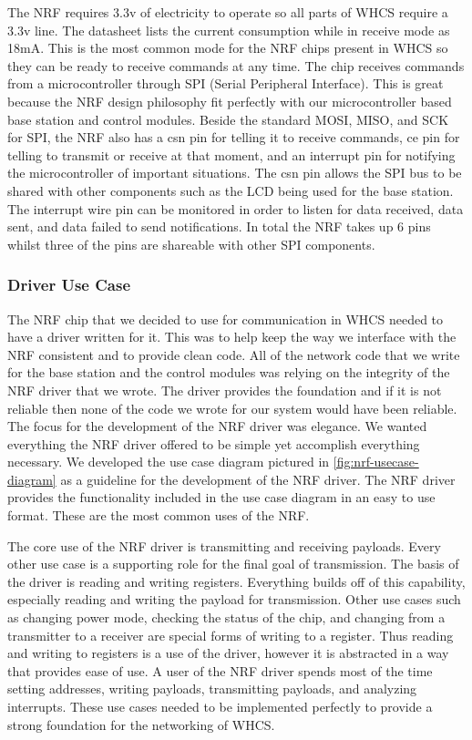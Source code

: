 The NRF requires 3.3v of electricity to operate so all parts of WHCS 
require a 3.3v line. The datasheet lists the current consumption while in
receive mode as 18mA. This is the most common mode for the NRF chips
present in WHCS so they can be ready to receive commands at any time. The chip
receives commands from a microcontroller through SPI (Serial Peripheral
Interface). This is great because the NRF design philosophy fit perfectly with
our microcontroller based base station and control modules. Beside the standard
MOSI, MISO, and SCK for SPI, the NRF also has a csn pin for telling it to
receive commands, ce pin for telling to transmit or receive at that moment,
and an interrupt pin for notifying the microcontroller of important situations.
The csn pin allows the SPI bus to be shared with other components such as
the LCD being used for the base station. The interrupt wire pin can be
monitored in order to listen for data received, data sent, and data failed to
send notifications. In total the NRF takes up 6 pins whilst three of the
pins are shareable with other SPI components.

\subsubsection{Driver Use Case}
The NRF chip that we decided to use for communication in WHCS needed to
have a driver written for it. This was to help keep the way we interface with the
NRF consistent and to provide clean code. All of the network code that we
write for the base station and the control modules was relying on the
integrity of the NRF driver that we wrote.  The driver provides the foundation
and if it is not reliable then none of the code we wrote for our system would have been
reliable. The focus for the development of the NRF driver was elegance. We wanted 
everything the NRF driver offered to be simple yet accomplish everything
necessary. We developed the use case diagram pictured in
\autoref{fig:nrf-usecase-diagram} as a guideline for the development of the NRF
driver. The NRF driver provides the functionality included in the use
case diagram in an easy to use format.  These are the most common uses of
the NRF.


The core use of the NRF driver is transmitting and receiving payloads. Every
other use case is a supporting role for the final goal of transmission. The
basis of the driver is reading and writing registers. Everything builds off of this capability, especially reading and writing the payload for
transmission. Other use cases such as changing power mode, checking the status
of the chip, and changing from a transmitter to a receiver are special
forms of writing to a register. Thus reading and writing to registers is a use
of the driver, however it is abstracted in a way that provides ease of
use. A user of the NRF driver spends most of the time setting addresses,
writing payloads, transmitting payloads, and analyzing interrupts. These use
cases needed to be implemented perfectly to provide a strong foundation for the
networking of WHCS.

